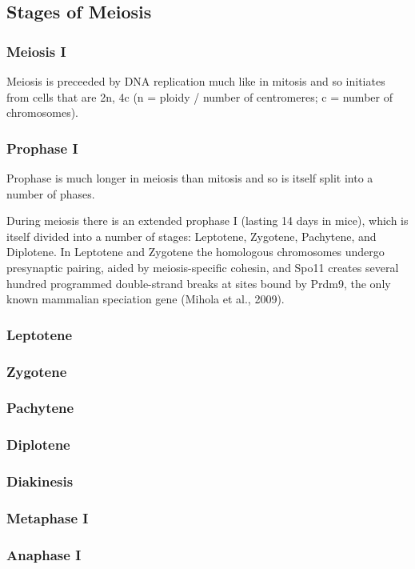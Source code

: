 \subsection{Stages of Meiosis}
\subsubsection{Meiosis I}
Meiosis is preceeded by DNA replication much like in mitosis and so initiates from cells that are 2n, 4c (n = ploidy / number of centromeres; c = number of chromosomes).
\subsubsection{Prophase I}
Prophase is much longer in meiosis than mitosis and so is itself split into a number of phases.

During meiosis there is an extended prophase I (lasting 14 days in mice), which is itself divided into a number of stages: Leptotene, Zygotene, Pachytene, and Diplotene. In Leptotene and Zygotene the homologous chromosomes undergo presynaptic pairing, aided by meiosis-specific cohesin, and Spo11 creates several hundred programmed double-strand breaks at sites bound by Prdm9, the only known mammalian speciation gene (Mihola et al., 2009). 


\subsubsection{Leptotene}

\subsubsection{Zygotene}
\subsubsection{Pachytene}
\subsubsection{Diplotene}
\subsubsection{Diakinesis}
\subsubsection{Metaphase I}
\subsubsection{Anaphase I}
